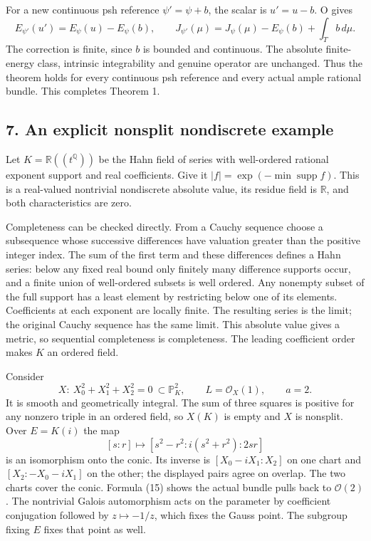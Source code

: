 \documentclass[
  11pt,
]{article}
\begin{document}
For a new continuous psh reference \(\psi'=\psi+b\), the scalar is
\(u'=u-b\). O gives \[
E_{\psi'}(u')=E_\psi(u)-E_\psi(b),\qquad
J_{\psi'}(\mu)=J_\psi(\mu)-E_\psi(b)+\int_Tb\,d\mu.
\tag{13}
\] The correction is finite, since \(b\) is bounded and continuous. The
absolute finite-energy class, intrinsic integrability and genuine
operator are unchanged. Thus the theorem holds for every continuous psh
reference and every actual ample rational bundle. This completes Theorem
1.

\subsection{7. An explicit nonsplit nondiscrete
example}\label{an-explicit-nonsplit-nondiscrete-example}

Let \(K=\mathbb R((t^{\mathbb Q}))\) be the Hahn field of series with
well-ordered rational exponent support and real coefficients. Give it
\(|f|=\exp(-\min\operatorname{supp}f)\). This is a real-valued
nontrivial nondiscrete absolute value, its residue field is
\(\mathbb R\), and both characteristics are zero.

Completeness can be checked directly. From a Cauchy sequence choose a
subsequence whose successive differences have valuation greater than the
positive integer index. The sum of the first term and these differences
defines a Hahn series: below any fixed real bound only finitely many
difference supports occur, and a finite union of well-ordered subsets is
well ordered. Any nonempty subset of the full support has a least
element by restricting below one of its elements. Coefficients at each
exponent are locally finite. The resulting series is the limit; the
original Cauchy sequence has the same limit. This absolute value gives a
metric, so sequential completeness is completeness. The leading
coefficient order makes \(K\) an ordered field.

Consider \[
X:\ X_0^2+X_1^2+X_2^2=0\ \subset\mathbb P^2_K,
\qquad L=\mathcal O_X(1),\qquad a=2.
\tag{14}
\] It is smooth and geometrically integral. The sum of three squares is
positive for any nonzero triple in an ordered field, so \(X(K)\) is
empty and \(X\) is nonsplit. Over \(E=K(i)\) the map \[
[s:r]\longmapsto[s^2-r^2:i(s^2+r^2):2sr]
\tag{15}
\] is an isomorphism onto the conic. Its inverse is \([X_0-iX_1:X_2]\)
on one chart and \([X_2:-X_0-iX_1]\) on the other; the displayed pairs
agree on overlap. The two charts cover the conic. Formula (15) shows the
actual bundle pulls back to \(\mathcal O(2)\). The nontrivial Galois
automorphism acts on the parameter by coefficient conjugation followed
by \(z\mapsto-1/z\), which fixes the Gauss point. The subgroup fixing
\(E\) fixes that point as well.
\end{document}
